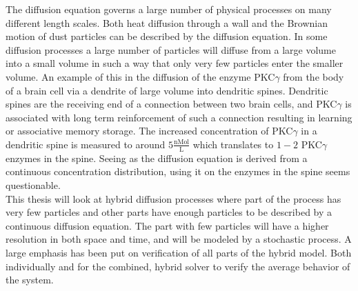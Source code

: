The diffusion equation governs a large number of physical processes on many different length scales. 
Both heat diffusion through a wall and the Brownian motion of dust particles can be described by the diffusion equation. 
In some diffusion processes a large number of particles will diffuse from a large volume into a small volume in such a way that only very few particles enter the smaller volume. 
An example of this in the diffusion of the enzyme PKC$\gamma$ from the body of a brain cell via a dendrite of large volume into dendritic spines. 
Dendritic spines are the receiving end of a connection between two brain cells, and PKC$\gamma$ is associated with long term reinforcement of such a connection resulting in learning or associative memory storage. 
The increased concentration of PKC$\gamma$ in a dendritic spine is measured to around $5\frac{\text{nMol}}{\text{L}}$ which translates to $1-2$ PKC$\gamma$ enzymes in the spine. 
Seeing as the diffusion equation is derived from a continuous concentration distribution, using it on the enzymes in the spine seems questionable. \\

This thesis will look at hybrid diffusion processes where part of the process has very few particles and other parts have enough particles to be described by a continuous diffusion equation. 
The part with few particles will have a higher resolution in both space and time, and will be modeled by a stochastic process. 
A large emphasis has been put on verification of all parts of the hybrid model. 
Both individually and for the combined, hybrid solver to verify the average behavior of the system.
